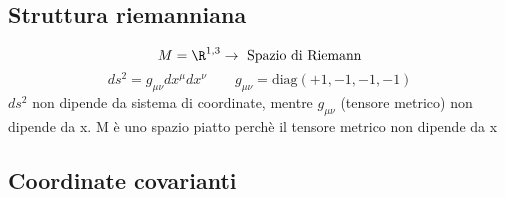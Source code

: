 \subsection*{Struttura riemanniana}
\begin{equation*}
    M = \R^{1,3} \rightarrow \text{ Spazio di Riemann}
\end{equation*}
\begin{equation*}
    ds^2 = g_{\mu\nu} dx^\mu dx^\nu  \qquad g_{\mu\nu} = \mbox{diag}(+1,-1,-1,-1)
\end{equation*}
$ds^2$ non dipende da sistema di coordinate, mentre $g_{\mu\nu}$ (tensore metrico) non dipende da x. M è uno spazio piatto perchè il tensore metrico non dipende da x

\subsection*{Coordinate covarianti}
